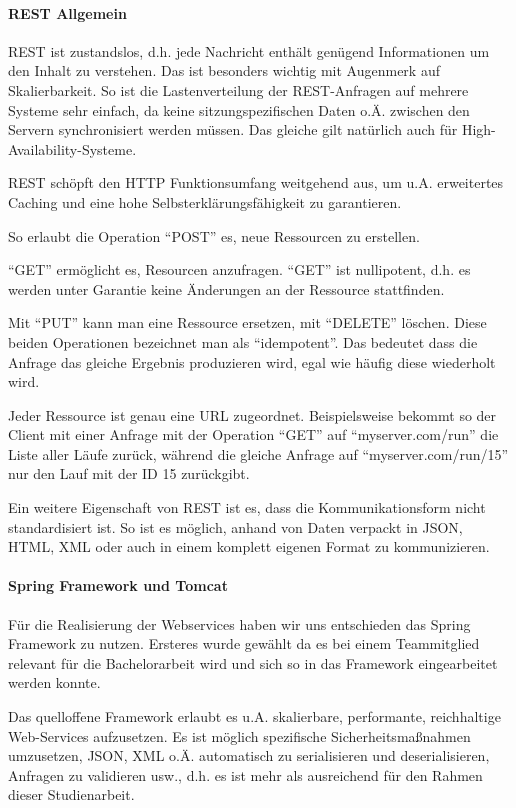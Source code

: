 \paragraph{REST Allgemein}
REST ist zustandslos, d.h. jede Nachricht enthält genügend Informationen um den Inhalt zu verstehen. Das ist besonders wichtig mit Augenmerk auf Skalierbarkeit. So ist die Lastenverteilung der REST-Anfragen auf mehrere Systeme sehr einfach, da keine sitzungspezifischen Daten o.Ä. zwischen den Servern synchronisiert werden müssen. Das gleiche gilt natürlich auch für High-Availability-Systeme.

REST schöpft den HTTP Funktionsumfang weitgehend aus, um u.A. erweitertes Caching und eine hohe Selbsterklärungsfähigkeit zu garantieren.

So erlaubt die Operation ``POST'' es, neue Ressourcen zu erstellen.

``GET'' ermöglicht es, Resourcen anzufragen. ``GET'' ist nullipotent, d.h. es werden unter Garantie keine Änderungen an der Ressource stattfinden.

Mit ``PUT'' kann man eine Ressource ersetzen, mit ``DELETE'' löschen. Diese beiden Operationen bezeichnet man als ``idempotent''. Das bedeutet dass die Anfrage das gleiche Ergebnis produzieren wird, egal wie häufig diese wiederholt wird.

Jeder Ressource ist genau eine URL zugeordnet. Beispielsweise bekommt so der Client mit einer Anfrage mit der Operation ``GET'' auf ``myserver.com/run'' die Liste aller Läufe zurück, während die gleiche Anfrage auf ``myserver.com/run/15'' nur den Lauf mit der ID 15 zurückgibt. 

Ein weitere Eigenschaft von REST ist es, dass die Kommunikationsform nicht standardisiert ist. So ist es möglich, anhand von Daten verpackt in JSON, HTML, XML oder auch in einem komplett eigenen Format zu kommunizieren.
\paragraph{Spring Framework und Tomcat}
Für die Realisierung der Webservices haben wir uns entschieden das Spring Framework zu nutzen.
Ersteres wurde gewählt da es bei einem Teammitglied relevant für die Bachelorarbeit wird und sich so in das Framework eingearbeitet werden konnte. 

Das quelloffene Framework erlaubt es u.A. skalierbare, performante, reichhaltige Web-Services aufzusetzen. Es ist möglich spezifische Sicherheitsmaßnahmen umzusetzen, JSON, XML o.Ä. automatisch zu serialisieren und deserialisieren, Anfragen zu validieren usw., d.h. es ist mehr als ausreichend für den Rahmen dieser Studienarbeit.


